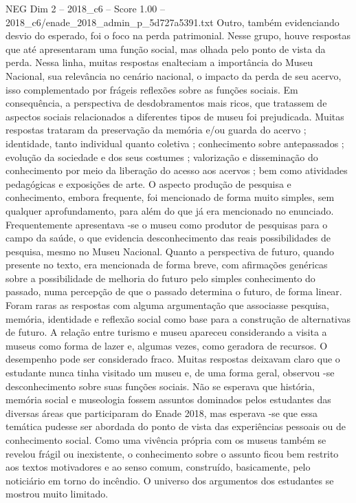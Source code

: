 \begin{textsample}{NEG Dim 2 – 2018\_c6 – Score 1.00 – 2018\_c6/enade\_2018\_admin\_p\_5d727a5391.txt}
Outro, também evidenciando desvio do esperado, foi o foco na perda patrimonial.
Nesse grupo, houve respostas que até apresentaram uma função social, mas olhada pelo ponto de vista da perda.
Nessa linha, muitas respostas enalteciam a importância do Museu Nacional, sua relevância no cenário nacional, o impacto da perda de seu acervo, isso complementado por frágeis reflexões sobre as funções sociais.
Em consequência, a perspectiva de desdobramentos mais ricos, que tratassem de aspectos sociais relacionados a diferentes tipos de museu foi prejudicada.
Muitas respostas trataram da preservação da memória e/ou guarda do acervo ; identidade, tanto individual quanto coletiva ; conhecimento sobre antepassados ; evolução da sociedade e dos seus costumes ; valorização e disseminação do conhecimento por meio da liberação do acesso aos acervos ; bem como atividades pedagógicas e exposições de arte.
O aspecto produção de pesquisa e conhecimento, embora frequente, foi mencionado de forma muito simples, sem qualquer aprofundamento, para além do que já era mencionado no enunciado.
Frequentemente apresentava -se o museu como produtor de pesquisas para o campo da saúde, o que evidencia desconhecimento das reais possibilidades de pesquisa, mesmo no Museu Nacional.
Quanto a perspectiva de futuro, quando presente no texto, era mencionada de forma breve, com afirmações genéricas sobre a possibilidade de melhoria do futuro pelo simples conhecimento do passado, numa percepção de que o passado determina o futuro, de forma linear.
Foram raras as respostas com alguma argumentação que associasse pesquisa, memória, identidade e reflexão social como base para a construção de alternativas de futuro.
A relação entre turismo e museu apareceu considerando a visita a museus como forma de lazer e, algumas vezes, como geradora de recursos.
O desempenho pode ser considerado fraco.
Muitas respostas deixavam claro que o estudante nunca tinha visitado um museu e, de uma forma geral, observou -se desconhecimento sobre suas funções sociais.
Não se esperava que história, memória social e museologia fossem assuntos dominados pelos estudantes das diversas áreas que participaram do Enade 2018, mas esperava -se que essa temática pudesse ser abordada do ponto de vista das experiências pessoais ou de conhecimento social.
Como uma vivência própria com os museus também se revelou frágil ou inexistente, o conhecimento sobre o assunto ficou bem restrito aos textos motivadores e ao senso comum, construído, basicamente, pelo noticiário em torno do incêndio.
O universo dos argumentos dos estudantes se mostrou muito limitado.

\end{textsample}
